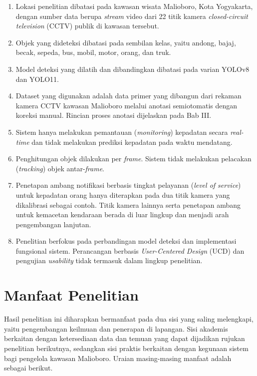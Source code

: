 \begin{enumerate}
    \item Lokasi penelitian dibatasi pada kawasan wisata Malioboro, Kota Yogyakarta, dengan sumber data berupa \textit{stream} video dari 22 titik kamera \textit{closed-circuit television} (CCTV) publik di kawasan tersebut.
    \item Objek yang dideteksi dibatasi pada sembilan kelas, yaitu andong, bajaj, becak, sepeda, bus, mobil, motor, orang, dan truk.
    \item Model deteksi yang dilatih dan dibandingkan dibatasi pada varian YOLOv8 dan YOLO11.
    \item Dataset yang digunakan adalah data primer yang dibangun dari rekaman kamera CCTV kawasan Malioboro melalui anotasi semiotomatis dengan koreksi manual. Rincian proses anotasi dijelaskan pada Bab III.
    \item Sistem hanya melakukan pemantauan (\textit{monitoring}) kepadatan secara \textit{real-time} dan tidak melakukan prediksi kepadatan pada waktu mendatang.
    \item Penghitungan objek dilakukan per \textit{frame}. Sistem tidak melakukan pelacakan (\textit{tracking}) objek antar-\textit{frame}.
    \item Penetapan ambang notifikasi berbasis tingkat pelayanan (\textit{level of service}) untuk kepadatan orang hanya diterapkan pada dua titik kamera yang dikalibrasi sebagai contoh. Titik kamera lainnya serta penetapan ambang untuk kemacetan kendaraan berada di luar lingkup dan menjadi arah pengembangan lanjutan.
    \item Penelitian berfokus pada perbandingan model deteksi dan implementasi fungsional sistem. Perancangan berbasis \textit{User-Centered Design} (UCD) dan pengujian \textit{usability} tidak termasuk dalam lingkup penelitian.
\end{enumerate}

\section{Manfaat Penelitian}

Hasil penelitian ini diharapkan bermanfaat pada dua sisi yang saling melengkapi, yaitu 
pengembangan keilmuan dan penerapan di lapangan. Sisi akademis berkaitan dengan 
ketersediaan data dan temuan yang dapat dijadikan rujukan penelitian berikutnya, 
sedangkan sisi praktis berkaitan dengan kegunaan sistem bagi pengelola kawasan Malioboro. 
Uraian masing-masing manfaat adalah sebagai berikut.

